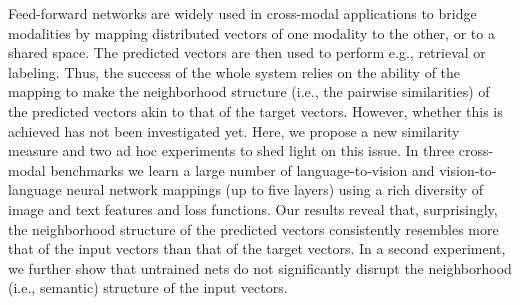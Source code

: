 Feed-forward networks are widely used in cross-modal applications to bridge modalities by mapping distributed vectors of one modality to the other, or to a shared space. The predicted vectors are then used to perform e.g., retrieval or labeling. Thus, the success of the whole system relies on the ability of the mapping to make the neighborhood structure (i.e., the pairwise similarities) of the predicted vectors akin to that of the target vectors. However, whether this is achieved has not been investigated yet. Here, we propose a new similarity measure and two ad hoc experiments to shed light on this issue. In three cross-modal benchmarks we learn a large number of language-to-vision and vision-to-language neural network mappings (up to five layers) using a rich diversity of image and text features and loss functions. Our results reveal that, surprisingly, the neighborhood structure of the predicted vectors consistently resembles more that of the input vectors than that of the target vectors. In a second experiment, we further show that untrained nets do not significantly disrupt the neighborhood (i.e., semantic) structure of the input vectors.
